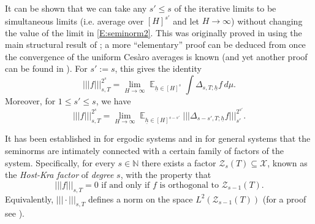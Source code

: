 \documentclass[11pt]{amsart}
\theoremstyle{definition}
\newcommand{\N}{{\mathbb N}}
\newcommand{\CX}{{\mathcal X}}
\newcommand{\CZ}{{\mathcal Z}}
\newcommand{\uh}{{\underline{h}}}
\newcommand{\nnorm}[1]{\lvert\!|\!| #1|\!|\!\rvert}
\DeclareMathOperator*{\E}{\mathbb{E}}
\begin{document}
It can be shown that we can take any $s'\leq s$  of the  iterative limits to be simultaneous limits (i.e. average over $[H]^{s'}$ and let $H\to\infty$)
without changing the value of the limit in \eqref{E:seminorm2}. This was originally proved in \cite{HK05a} using  the main structural result of \cite{HK05a}; a more ``elementary'' proof  can be deduced from \cite[Lemma~1.12]{BL15} once the convergence of the uniform Ces\`aro averages is known (and yet another proof can be found in \cite[Lemma~1]{Ho09}).
For $s':=s$, this gives the identity
\begin{equation}\label{E:seminorm}
\nnorm{f}_{s,T}^{2^s}=\lim_{H\to\infty}\E_{\uh\in [H]^s} \int \Delta_{s, T; \uh}f\, d\mu.
\end{equation}
 Moreover,  for $1\leq s'\leq s$, we have
\begin{equation}\label{E:seminorm4}
	\nnorm{f}_{s,T}^{2^{s}}=\lim_{H\to\infty}\E_{\uh\in [H]^{s-s'}} \nnorm{\Delta_{s-s',T;\uh}f}_{s'}^{2^{s'}}.
\end{equation}



It has been established in \cite{HK05a} for ergodic systems and in \cite[Chapter~8, Theorem~14]{HK18} for general systems that the seminorms are intimately connected with a certain family of factors of the system. Specifically, for every $s\in\N$ there exists a factor $\CZ_s(T)\subseteq\CX$, known as the \emph{Host-Kra factor} of \emph{degree} $s$, with the property that
\begin{equation*}%
\nnorm{f}_{s, T} = 0  \text{ if and only if } f \text{ is orthogonal to } \CZ_{s-1}(T).
\end{equation*}
 Equivalently, $\nnorm{\cdot}_{s, T}$ defines a norm on the space $L^2(\CZ_{s-1}(T))$ (for a proof see  \cite[Theorem~15, Chapter~9]{HK18}).
\end{document}
